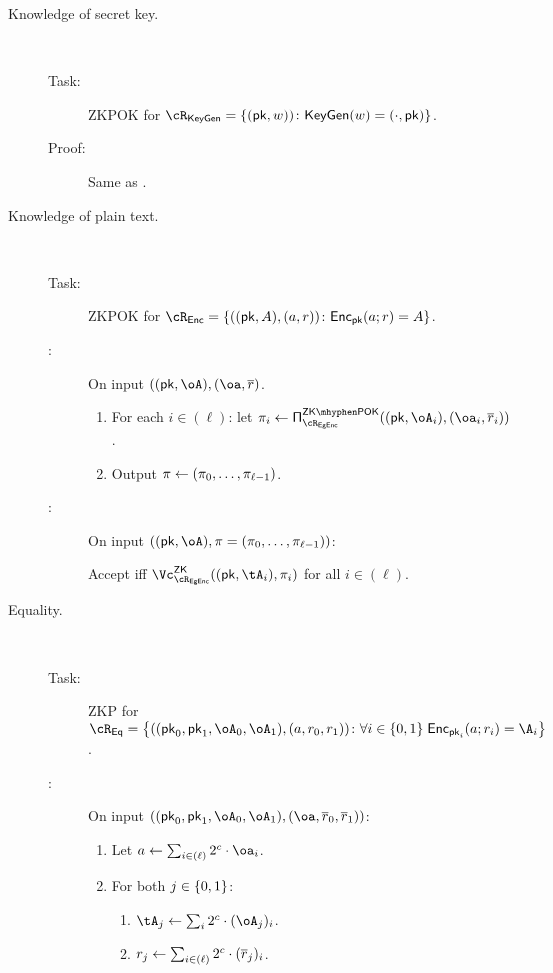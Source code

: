 \begin{description}
	\item[Knowledge of secret key.] ~
	
	\begin{description}
		\item[Task:] ZKPOK for $\rKeyGen=\rKeyGenDef$.
		
		\item[Proof:] Same as \piZKPOK{\rEgKeyGen}. 
		
	\end{description}
	
	
	\item[Knowledge of plain text.] ~
	
	

	\begin{description}
		\item[Task:] ZKPOK for $\rEnc=\rEncDef$.
		
		\item[\Pc:] On  input  $((\pk,\oA),(\oa,\orr)$.
		\begin{enumerate}
			\item For each $i\in (\ell)$: let  $\pi_i \asn \piZKPOK{\rEGEnc}((\pk,\oA_i),(\oa_i,\orr_i))$. 
			
			\item Output $\pi \leftarrow (\pi_0,\ldots, \pi_{\ell-1})$.
			
		\end{enumerate}
		
		
	\item[\Vc:] On  input  $((\pk,\oA),\pi = (\pi_0,\ldots, \pi_{\ell-1}))$:
	
	 Accept iff  $\vZK{\rEGEnc}((\pk,\tA_i), \pi_i)$ for all $i\in (\ell)$.
		
	\end{description}
	
\item[Equality.]~ 


\begin{description}
	\item[Task:] ZKP for $\rEq =\rEqDef$.
	
	\item[\Pc:]  On input $((\pk_0,\pk_1,\oA_0,\oA_1),(\oa,\orr_0,\orr_1))$: 
	

	\begin{enumerate}
		
		\item Let  $a \asn  \sum_{i\in (\ell)}    2^c \cdot \oa_i$. 
		
		\item For both $j\in \zo$:
		\begin{enumerate}
			\item    $\tA_j \asn  \sum_i  2^c \cdot (\oA_j)_i$. 
			\item    $r_j \leftarrow  \sum_{i\in (\ell)}  2^c \cdot (\overline{r}_j)_i$. 
			

\end{enumerate}
\end{enumerate}
\end{description}
\end{description}
